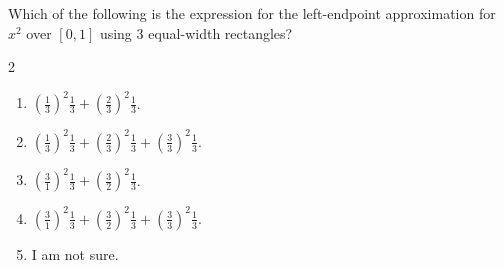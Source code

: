 \documentclass[aspectratio=169, 14pt, t]{beamer}  %
\begin{document}
\begin{poll}
  Which of the following is the expression for the left-endpoint approximation for \(x^{2}\) over \([0,1]\) using \(3\) equal-width rectangles?

  \begin{multicols}{2}
    \begin{enumerate}
      \item \(\left(\frac{1}{3}\right)^{2}\frac{1}{3} + \left(\frac{2}{3}\right)^{2}\frac{1}{3}\).
      \item \(\left(\frac{1}{3}\right)^{2}\frac{1}{3} + \left(\frac{2}{3}\right)^{2}\frac{1}{3} + \left( \frac{3}{3} \right)^{2} \frac{1}{3}\).
      \item \(\left(\frac{3}{1}\right)^{2}\frac{1}{3} + \left(\frac{3}{2}\right)^{2}\frac{1}{3}\).
      \item \(\left(\frac{3}{1}\right)^{2}\frac{1}{3} + \left(\frac{3}{2}\right)^{2}\frac{1}{3} + \left( \frac{3}{3} \right)^{2} \frac{1}{3}\).
      \item I am not sure.
    \end{enumerate}
  \end{multicols}

  \pause
  \bigskip
  \begin{center}
  \end{center}


\end{poll}
\end{document}
